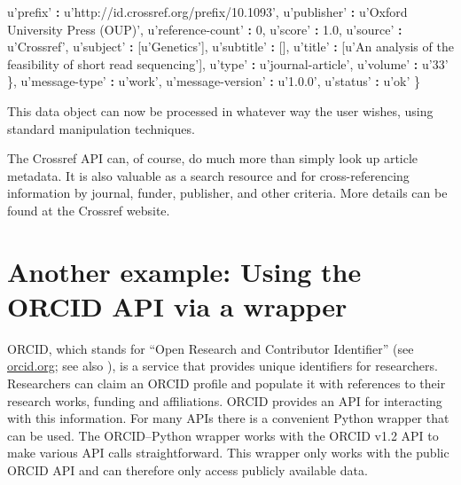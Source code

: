 \documentclass[]{krantz}
\newenvironment{Shaded}{\begin{snugshade}}{\end{snugshade}}
\newcommand{\DecValTok}[1]{\textcolor[rgb]{0.00,0.00,0.81}{#1}}
\newcommand{\FloatTok}[1]{\textcolor[rgb]{0.00,0.00,0.81}{#1}}
\newcommand{\StringTok}[1]{\textcolor[rgb]{0.31,0.60,0.02}{#1}}
\newcommand{\OperatorTok}[1]{\textcolor[rgb]{0.81,0.36,0.00}{\textbf{#1}}}
\newcommand{\NormalTok}[1]{#1}
\begin{document}
\begin{Shaded}
\begin{Highlighting}[]
\NormalTok{    u}\StringTok{'prefix'} \OperatorTok{:}\StringTok{ }\NormalTok{u}\StringTok{'http://id.crossref.org/prefix/10.1093'}\NormalTok{,}
\NormalTok{    u}\StringTok{'publisher'} \OperatorTok{:}\StringTok{ }\NormalTok{u}\StringTok{'Oxford University Press (OUP)'}\NormalTok{,}
\NormalTok{    u}\StringTok{'reference-count'} \OperatorTok{:}\StringTok{ }\DecValTok{0}\NormalTok{,}
\NormalTok{    u}\StringTok{'score'} \OperatorTok{:}\StringTok{ }\FloatTok{1.0}\NormalTok{,}
\NormalTok{    u}\StringTok{'source'} \OperatorTok{:}\StringTok{ }\NormalTok{u}\StringTok{'Crossref'}\NormalTok{,}
\NormalTok{    u}\StringTok{'subject'} \OperatorTok{:}\StringTok{ }\NormalTok{[u}\StringTok{'Genetics'}\NormalTok{],}
\NormalTok{    u}\StringTok{'subtitle'} \OperatorTok{:}\StringTok{ }\NormalTok{[],}
\NormalTok{    u}\StringTok{'title'} \OperatorTok{:}\StringTok{ }\NormalTok{[u}\StringTok{'An analysis of the feasibility of short read sequencing'}\NormalTok{],}
\NormalTok{    u}\StringTok{'type'} \OperatorTok{:}\StringTok{ }\NormalTok{u}\StringTok{'journal-article'}\NormalTok{,}
\NormalTok{    u}\StringTok{'volume'} \OperatorTok{:}\StringTok{ }\NormalTok{u}\StringTok{'33'}
\NormalTok{  \},}
\NormalTok{  u}\StringTok{'message-type'} \OperatorTok{:}\StringTok{ }\NormalTok{u}\StringTok{'work'}\NormalTok{,}
\NormalTok{  u}\StringTok{'message-version'} \OperatorTok{:}\StringTok{ }\NormalTok{u}\StringTok{'1.0.0'}\NormalTok{,}
\NormalTok{  u}\StringTok{'status'} \OperatorTok{:}\StringTok{ }\NormalTok{u}\StringTok{'ok'}
\NormalTok{\}}
\end{Highlighting}
\end{Shaded}

This data object can now be processed in whatever way the user wishes,
using standard manipulation techniques.

The Crossref API can, of course, do much more than simply look up
article metadata. It is also valuable as a search resource and for
cross-referencing information by journal, funder, publisher, and other
criteria. More details can be found at the Crossref website.

\section{Another example: Using the ORCID API via a
wrapper}\label{another-example-using-the-orcid-api-via-a-wrapper}

ORCID, which stands for ``Open Research and Contributor Identifier''
(see \url{orcid.org}; see also \citep{haak2012orcid}), is a service that
provides unique identifiers for researchers. Researchers can claim an
ORCID profile and populate it with references to their research works,
funding and affiliations. ORCID provides an API for interacting with
this information. For many APIs there is a convenient Python wrapper
that can be used. The ORCID--Python wrapper works with the ORCID v1.2
API to make various API calls straightforward. This wrapper only works
with the public ORCID API and can therefore only access publicly
available data.
\end{document}
